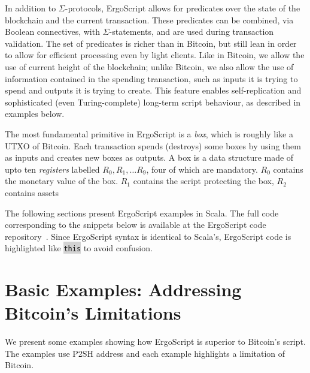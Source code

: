 \documentclass[11pt]{article}
\newcommand\Hi[2][lightgray]{%
	\hspace*{-\fboxsep}%
	\colorbox{#1}{#2}%
	\hspace*{-\fboxsep}%
}
\newcommand{\authnote}[2]{\marginpar{\parbox{\marginparwidth}{\tiny %
  \textsf{#1 {\textcolor{blue}{notes: #2}}}}}%
  \textcolor{blue}{\textbf{\dag}}}
\newcommand{\authnote}[2]{
  \textsf{#1 \textcolor{blue}{: #2}}}
\newcommand{\authnote}[2]{}
\newcommand{\lnote}[1]{{\authnote{\textcolor{orange}{Leo notes}}{#1}}}
\newcommand{\snote}[1]{{\authnote{\textcolor{yellow}{Scalahub notes}}{#1}}}
\newcommand{\langname}{ErgoScript\xspace}
\begin{document}
In addition to $\Sigma$-protocols, \langname allows for predicates over the state of the blockchain and the current transaction. These predicates can be combined, via Boolean connectives, with $\Sigma$-statements, and are used during transaction validation. The set of predicates is richer than in Bitcoin, but still lean in order to allow for efficient processing even by light clients. Like in Bitcoin, we allow the use of current height of the blockchain; unlike Bitcoin, we also allow the use of information contained in the spending transaction, such as inputs it is trying to spend and outputs it is trying to create. This feature enables self-replication and sophisticated (even Turing-complete) long-term script behaviour, as described in examples below.





The most fundamental primitive in \langname is a \emph{box}, which is roughly like a UTXO of Bitcoin. Each transaction spends (destroys) some boxes by using them as inputs and creates new boxes as outputs. A box is a data structure made of upto ten {\em registers} labelled $R_0, R_1,\ldots R_9$, four of which are mandatory. 
$R_0$ contains the monetary value of the box. $R_1$ contains the script protecting the box, $R_2$ contains assets 

The following sections present \langname examples in Scala. The full code corresponding to the snippets below is available at the \langname code repository~\cite{langrepo}. 
Since \langname syntax is identical to Scala's, \langname code is highlighted like \Hi{\texttt{this}} to avoid confusion. 
\section{Basic Examples: Addressing Bitcoin's Limitations}
We present some examples showing how \langname is superior to Bitcoin's script. The examples use P2SH address and each example highlights a limitation of Bitcoin. 
\end{document}
